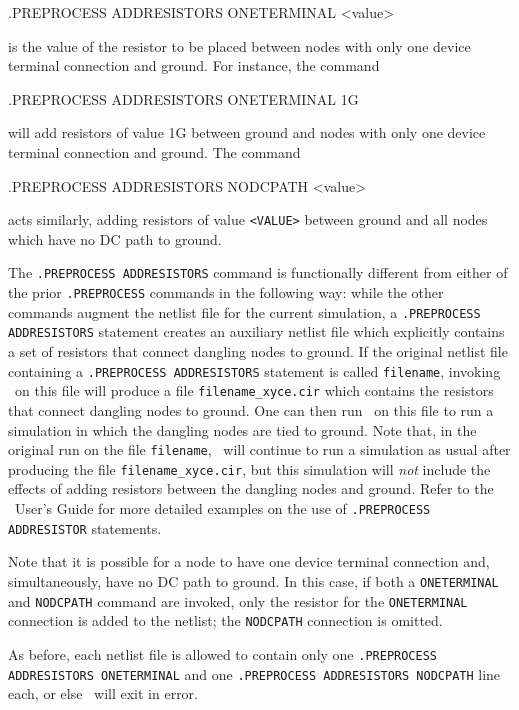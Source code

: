\begin{Command}

\format
.PREPROCESS ADDRESISTORS ONETERMINAL <value>

\arguments

\begin{Arguments}


is the value of the resistor to be placed between
nodes with only one device terminal connection and ground.  For instance,
the command

\end{Arguments}

\examples
.PREPROCESS ADDRESISTORS ONETERMINAL 1G

\normalfont
will add resistors of value 1G between ground and nodes with only one
device terminal connection and ground.  The command

\examples

.PREPROCESS ADDRESISTORS NODCPATH <value>

\normalfont

acts similarly, adding resistors of value {\tt <VALUE>} between ground and
all nodes which have no DC path to ground.

The {\tt .PREPROCESS ADDRESISTORS} command is functionally different from
either of the prior {\tt .PREPROCESS} commands in the following way:  while
the other commands augment the netlist file for the current simulation, a
{\tt .PREPROCESS ADDRESISTORS} statement creates an auxiliary netlist file
which explicitly contains a set of resistors that connect dangling nodes to
ground.  If the original netlist file containing a {\tt .PREPROCESS
ADDRESISTORS} statement is called {\tt filename}, invoking \Xyce~on this file
will produce a file {\tt filename\_xyce.cir} which contains the resistors that
connect dangling nodes to ground.  One can then run \Xyce~on this file to
run a simulation in which the dangling nodes are tied to ground.  Note that,
in the original run on the file {\tt filename}, \Xyce~will continue to run a
simulation as usual after producing the file {\tt filename\_xyce.cir}, but this
simulation will {\em not} include the effects of adding resistors between the
dangling nodes and ground.  Refer to the \Xyce~User's Guide for more detailed
examples on the use of {\tt .PREPROCESS ADDRESISTOR} statements.

Note that it is possible for a node to have one device terminal connection
and, simultaneously, have no DC path to ground.  In this case, if both a
{\tt ONETERMINAL} and {\tt NODCPATH} command are invoked, only the resistor
for the {\tt ONETERMINAL} connection is added to the netlist; the
{\tt NODCPATH} connection is omitted.

As before, each netlist file is allowed to contain only one {\tt .PREPROCESS
ADDRESISTORS ONETERMINAL} and one {\tt .PREPROCESS ADDRESISTORS NODCPATH} line
each, or else \Xyce~will exit in error.

\end{Command}
